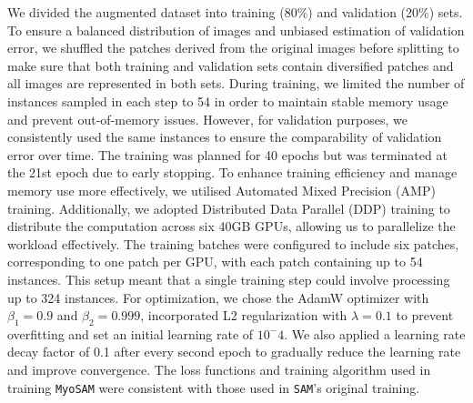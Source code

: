 We divided the augmented dataset into training (80\%) and validation (20\%) sets. To ensure a balanced distribution of images and unbiased estimation of validation error, we shuffled the patches derived from the original images before splitting to make sure that both training and validation sets contain diversified patches and all images are represented in both sets.
During training, we limited the number of instances sampled in each step to 54 in order to maintain stable memory usage and prevent out-of-memory issues. However, for validation purposes, we consistently used the same instances to ensure the comparability of validation error over time. The training was planned for 40 epochs but was terminated at the 21st epoch due to early stopping.
To enhance training efficiency and manage memory use more effectively, we utilised Automated Mixed Precision (AMP) training. Additionally, we adopted Distributed Data Parallel (DDP) training to distribute the computation across six 40GB GPUs, allowing us to parallelize the workload effectively. The training batches were configured to include six patches, corresponding to one patch per GPU, with each patch containing up to 54 instances. This setup meant that a single training step could involve processing up to 324 instances.
For optimization, we chose the AdamW optimizer with $\beta_1 = 0.9$ and $\beta_2 = 0.999$, incorporated L2 regularization with $\lambda = 0.1$ to prevent overfitting and set an initial learning rate of $10^-4$. We also applied a learning rate decay factor of 0.1 after every second epoch to gradually reduce the learning rate and improve convergence. The loss functions and training algorithm used in training \texttt{MyoSAM} were consistent with those used in \texttt{SAM}'s original training.

